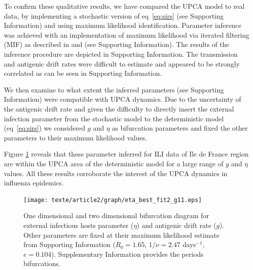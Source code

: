 To confirm these qualitative results, we have compared the UPCA model
to real data, by implementing a stochastic version of
eq~\eqref{eq:sirs} (see Supporting Information) and using maximum
likelihood identification. Parameter inference was achieved with an
implementation of maximum likelihood via iterated filtering (MIF) as
described in \citet{Ionides2006} and \citet{Breto2009} (see Supporting
Information).
The results of the inference procedure are depicted in Supporting
Information. The transmission and antigenic drift rates were difficult
to estimate and appeared to be strongly correlated as can be seen in
Supporting Information. 


We then examine to what extent the inferred parameters (see Supporting
Information) were compatible with UPCA dynamics. Due to the
uncertainty of the antigenic drift rate and given the difficulty to
directly insert the external infection parameter from the stochastic
model to the deterministic model (eq~\eqref{eq:sirs}) we considered
$g$ and $\eta$ as bifurcation parameters and fixed the other
parameters to their maximum likelihood values.

Figure \ref{fig:eta_best_fit2} reveals that these parameter inferred
for ILI data of Ile de France region are within the UPCA area of the
deterministic model for a large range of $g$ and $\eta$ values. All
these results corroborate the interest of the UPCA dynamics in
influenza epidemics.


\begin{figure}[htbp]
  \center
  \texttt{[image: texte/article2/graph/eta\_best\_fit2\_g11.eps]}
  \caption{One dimensional and two dimensional bifurcation diagram for
    external infectious hosts parameter ($\eta$) and antigenic drift
    rate ($g$). Other parameters are fixed at their maximum likelihood
    estimate from Supporting Information ($R_0=1.65$, $1/\nu=2.47$
    days$^{-1}$, $e=0.104$). Supplementary Information provides the
    periods bifurcations.  }
  \label{fig:eta_best_fit2}
\end{figure}

